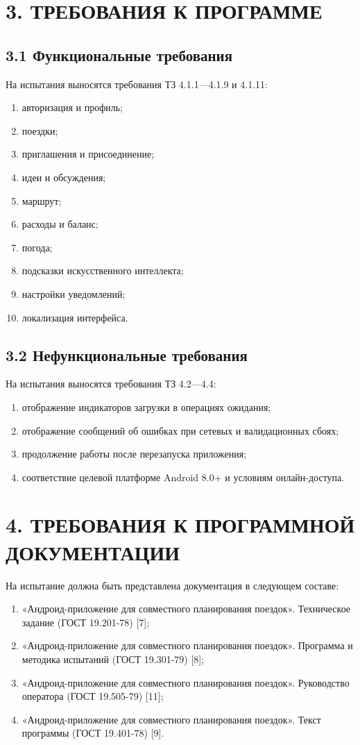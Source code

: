 \documentclass[12pt,a4paper]{article}
\begin{document}
\clearpage
\section*{3. ТРЕБОВАНИЯ К ПРОГРАММЕ}

\subsection*{3.1 Функциональные требования}
На испытания выносятся требования ТЗ 4.1.1---4.1.9 и 4.1.11:
\begin{enumerate}
  \item авторизация и профиль;
  \item поездки;
  \item приглашения и присоединение;
  \item идеи и обсуждения;
  \item маршрут;
  \item расходы и баланс;
  \item погода;
  \item подсказки искусственного интеллекта;
  \item настройки уведомлений;
  \item локализация интерфейса.
\end{enumerate}

\subsection*{3.2 Нефункциональные требования}
На испытания выносятся требования ТЗ 4.2---4.4:
\begin{enumerate}
  \item отображение индикаторов загрузки в операциях ожидания;
  \item отображение сообщений об ошибках при сетевых и валидационных сбоях;
  \item продолжение работы после перезапуска приложения;
  \item соответствие целевой платформе Android 8.0+ и условиям онлайн-доступа.
\end{enumerate}

\clearpage
\section*{4. ТРЕБОВАНИЯ К ПРОГРАММНОЙ ДОКУМЕНТАЦИИ}
На испытание должна быть представлена документация в следующем составе:
\begin{enumerate}
  \item «Андроид-приложение для совместного планирования поездок». Техническое задание (ГОСТ 19.201-78) [7];
  \item «Андроид-приложение для совместного планирования поездок». Программа и методика испытаний (ГОСТ 19.301-79) [8];
  \item «Андроид-приложение для совместного планирования поездок». Руководство оператора (ГОСТ 19.505-79) [11];
  \item «Андроид-приложение для совместного планирования поездок». Текст программы (ГОСТ 19.401-78) [9].
\end{enumerate}
\end{document}
